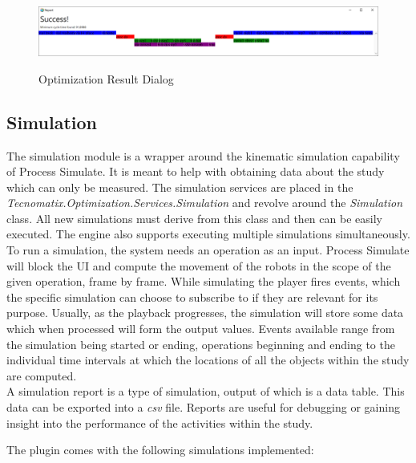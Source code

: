 \begin{figure}[ht]
	\caption{Optimization Result Dialog}
	\centering
	\includegraphics[width=\textwidth]{dialog_optimizationresult}
	\label{fig:DialogOptimizationResult}
\end{figure}

\subsection{Simulation}

The simulation module is a wrapper around the kinematic simulation capability of Process Simulate. It is meant to help with obtaining data about the study which can only be measured. The simulation services are placed in the \emph{Tecnomatix.Optimization.Services.Simulation} and revolve around the \emph{Simulation} class. All new simulations must derive from this class and then can be easily executed. The engine also supports executing multiple simulations simultaneously. \\

To run a simulation, the system needs an operation as an input. Process Simulate will block the UI and compute the movement of the robots in the scope of the given operation, frame by frame. While simulating the player fires events, which the specific simulation can choose to subscribe to if they are relevant for its purpose. Usually, as the playback progresses, the simulation will store some data which when processed will form the output values. Events available range from the simulation being started or ending, operations beginning and ending to the individual time intervals at which the locations of all the objects within the study are computed. \\

A simulation report is a type of simulation, output of which is a data table. This data can be exported into a \emph{csv} file. Reports are useful for debugging or gaining insight into the performance of the activities within the study.

The plugin comes with the following simulations implemented:

